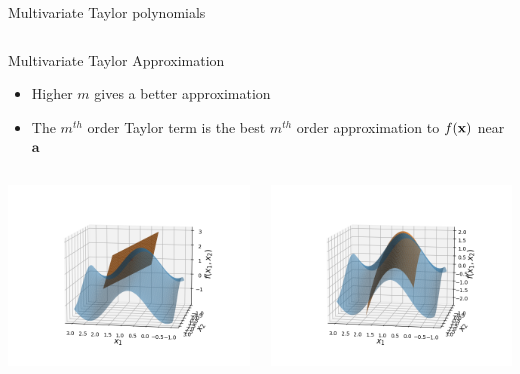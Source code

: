 \documentclass[11pt,compress,t,notes=noshow, xcolor=table]{beamer}
\begin{document}
\begin{vbframe}{Multivariate Taylor polynomials}
\begin{columns}
\begin{column}{0.3\textwidth}
    \end{column}
  \end{columns}  


\end{vbframe}

\begin{vbframe}{Multivariate Taylor Approximation}

\begin{itemize}
  \item Higher $m$ gives a better approximation
  \item The $m^{th}$ order Taylor term is the best $m^{th}$ order approximation to $f(\mathbf{x})$ near $\bm{a}$
\end{itemize}


\begin{columns}
\begin{column}{0.48\textwidth}
  \includegraphics[width = \textwidth]{figure_man/Taylor2D/Taylor2D_1st100.png}
\end{column}
\begin{column}{0.48\textwidth}
  \includegraphics[width = \textwidth]{figure_man/Taylor2D/Taylor2D_2nd-100.png}
\end{column}
\end{columns}


\end{vbframe}
\end{document}
